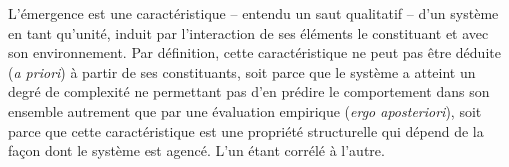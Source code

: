 L'émergence est une caractéristique -- entendu un saut qualitatif -- d'un système en tant qu'unité, induit par l'interaction de ses éléments le constituant et avec son environnement. Par définition, cette caractéristique ne peut pas être déduite (\textit{a priori}) à partir de ses constituants, soit parce que le système a atteint un degré de complexité ne permettant pas d'en prédire le comportement dans son ensemble autrement que par une évaluation empirique (\textit{ergo aposteriori}), soit parce que cette caractéristique est une propriété structurelle qui dépend de la façon dont le système est agencé. 
 L'un étant corrélé à l'autre.


